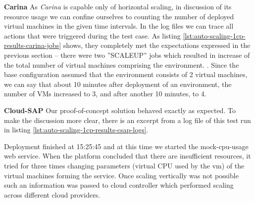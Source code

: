 \begin{asparaenum}
  \item[\textbf{Carina}] As \emph{Carina} is capable only of horizontal scaling, in discussion of its resource usage we can confine ourselves to counting the number of deployed virtual machines in the given time intervals. In the log files we can trace all actions that were triggered during the test case. As listing \ref{lst:auto-scaling-1cp-results-carina-jobs} shows, they completely met the expectations expressed in the previous section -- there were two ''SCALEUP'' jobs which resulted in increase of the total number of virtual machines comprising the environment.  . Since the base configuration assumed that the environment consists of 2 virtual machines, we can say that about 10 minutes after deployment of an environment, the number of VMs increased to 3, and after another 10 minutes, to 4.
  \item[\textbf{Cloud-SAP}] Our proof-of-concept solution behaved exactly as expected. To make the discussion more clear, there is an excerpt from a log file of this test run in listing \ref{lst:auto-scaling-1cp-results-csap-logs}. 

Deployment finished at 15:25:45 and at this time we started the mock-cpu-usage web service. When the platform concluded that there are insufficient resources, it tried for three times changing parameters (virtual CPU used by the vm) of the virtual machines forming the service. Once scaling vertically was not possible such an information was passed to cloud controller which performed scaling across different cloud providers.
\end{asparaenum}

